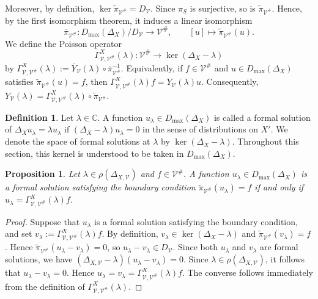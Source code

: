 \documentclass[12pt]{amsart}
\theoremstyle{plain}
\newtheorem{prop}[thm]{Proposition}
\theoremstyle{definition}
\newtheorem{defn}[thm]{Definition}
\theoremstyle{remark}
\numberwithin{equation}{section} \numberwithin{figure}{section}
\newcommand{\mb}[1]{\mathbb{#1}} %
\begin{document}
Moreover, by definition,
\(\ker\widetilde{\pi}_{\mathcal V^\#}=D_{\mathcal V}\).
Since \(\pi_S\) is surjective, so is
\(\widetilde{\pi}_{\mathcal V^\#}\). Hence, by the first
isomorphism theorem, it induces a linear isomorphism
\[
\overline{\pi}_{\mathcal V^\#}:
D_{\max}(\Delta_X)/D_{\mathcal V}
\longrightarrow
\mathcal V^\#,
\qquad
[u]\longmapsto
\widetilde{\pi}_{\mathcal V^\#}(u).
\]
We define the Poisson operator
\[
\Gamma_{\mathcal V,\mathcal V^\#}^{X}(\lambda):
\mathcal V^\#
\longrightarrow
\ker(\Delta_X-\lambda)
\]
by
\(
\Gamma_{\mathcal V,\mathcal V^\#}^{X}(\lambda)
:=
\overline{Y}_{\mathcal V}(\lambda)
\circ
\overline{\pi}_{\mathcal V^\#}^{-1}.
\)
Equivalently, if \(f\in\mathcal V^\#\) and
\(u\in D_{\max}(\Delta_X)\) satisfies
\(\widetilde{\pi}_{\mathcal V^\#}(u)=f\), then
\(
\Gamma_{\mathcal V,\mathcal V^\#}^{X}(\lambda)f
=
Y_{\mathcal V}(\lambda)u.
\)
Consequently,
\(
Y_{\mathcal V}(\lambda)
=
\Gamma_{\mathcal V,\mathcal V^\#}^{X}(\lambda)
\circ
\widetilde{\pi}_{\mathcal V^\#}.
\)

\begin{defn}\label{defn:formal-solution}
Let \(\lambda\in\mb C\). A function
\(u_\lambda\in D_{\max}(\Delta_X)\) is called a formal solution of
\(\Delta_Xu_\lambda=\lambda u_\lambda\) if
\((\Delta_X-\lambda)u_\lambda=0\) in the sense of distributions on
\(X'\). We denote the space of formal solutions at \(\lambda\) by
\(\ker(\Delta_X-\lambda)\). Throughout this section, this kernel is
understood to be taken in \(D_{\max}(\Delta_X)\).
\end{defn}

\begin{prop}\label{prop:Gamma-characterization}
Let \(\lambda\in\rho(\Delta_{X,\mathcal V})\) and
\(f\in\mathcal V^\#\). A function
\(u_\lambda\in D_{\max}(\Delta_X)\) is a formal solution satisfying
the boundary condition
\(\widetilde{\pi}_{\mathcal V^\#}(u_\lambda)=f\) if and only if
\(u_\lambda
=\Gamma_{\mathcal V,\mathcal V^\#}^{X}(\lambda)f\).
\end{prop}

\begin{proof}
Suppose that \(u_\lambda\) is a formal solution satisfying the
boundary condition, and set
\(v_\lambda:=
\Gamma_{\mathcal V,\mathcal V^\#}^{X}(\lambda)f\).
By definition,
\(v_\lambda\in\ker(\Delta_X-\lambda)\) and
\(\widetilde{\pi}_{\mathcal V^\#}(v_\lambda)=f\). Hence
\(\widetilde{\pi}_{\mathcal V^\#}
(u_\lambda-v_\lambda)=0\), so
\(u_\lambda-v_\lambda\in D_{\mathcal V}\).
Since both \(u_\lambda\) and \(v_\lambda\) are formal solutions, we
have
\((\Delta_{X,\mathcal V}-\lambda)
(u_\lambda-v_\lambda)=0\).
Since \(\lambda\in\rho(\Delta_{X,\mathcal V})\), it follows that
\(u_\lambda-v_\lambda=0\). Hence
\(u_\lambda=v_\lambda
=\Gamma_{\mathcal V,\mathcal V^\#}^{X}(\lambda)f\).
The converse follows immediately from the definition of
\(\Gamma_{\mathcal V,\mathcal V^\#}^{X}(\lambda)\).
\end{proof}
\end{document}
